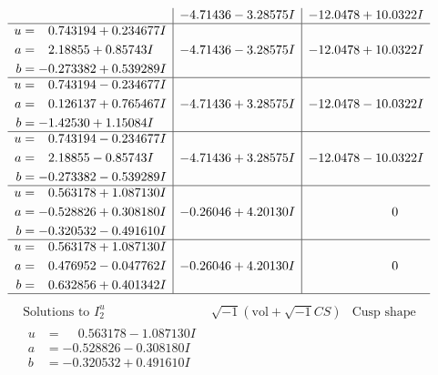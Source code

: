 \documentclass[1p]{elsarticle_modified}
\theoremstyle{definition}
\newcommand{\I}{\sqrt{-1}}
\begin{document}
$$\begin{array}{c|c|c}
 & -4.71436 - 3.28575 I & -12.0478 + 10.0322 I \\ \hline\begin{aligned}
u &= \phantom{-}0.743194 + 0.234677 I \\
a &= \phantom{-}2.18855 + 0.85743 I \\
b &= -0.273382 + 0.539289 I\end{aligned}
 & -4.71436 - 3.28575 I & -12.0478 + 10.0322 I \\ \hline\begin{aligned}
u &= \phantom{-}0.743194 - 0.234677 I \\
a &= \phantom{-}0.126137 + 0.765467 I \\
b &= -1.42530 + 1.15084 I\end{aligned}
 & -4.71436 + 3.28575 I & -12.0478 - 10.0322 I \\ \hline\begin{aligned}
u &= \phantom{-}0.743194 - 0.234677 I \\
a &= \phantom{-}2.18855 - 0.85743 I \\
b &= -0.273382 - 0.539289 I\end{aligned}
 & -4.71436 + 3.28575 I & -12.0478 - 10.0322 I \\ \hline\begin{aligned}
u &= \phantom{-}0.563178 + 1.087130 I \\
a &= -0.528826 + 0.308180 I \\
b &= -0.320532 - 0.491610 I\end{aligned}
 & -0.26046 + 4.20130 I & \phantom{-0.000000 } 0 \\ \hline\begin{aligned}
u &= \phantom{-}0.563178 + 1.087130 I \\
a &= \phantom{-}0.476952 - 0.047762 I \\
b &= \phantom{-}0.632856 + 0.401342 I\end{aligned}
 & -0.26046 + 4.20130 I & \phantom{-0.000000 } 0\\
 \hline 
 \end{array}$$\newpage$$\begin{array}{c|c|c}  
\text{Solutions to }I^u_{2}& \I (\text{vol} + \sqrt{-1}CS) & \text{Cusp shape}\\
 \hline 
\begin{aligned}
u &= \phantom{-}0.563178 - 1.087130 I \\
a &= -0.528826 - 0.308180 I \\
b &= -0.320532 + 0.491610 I\end{aligned}

\end{array}$$
\end{document}
